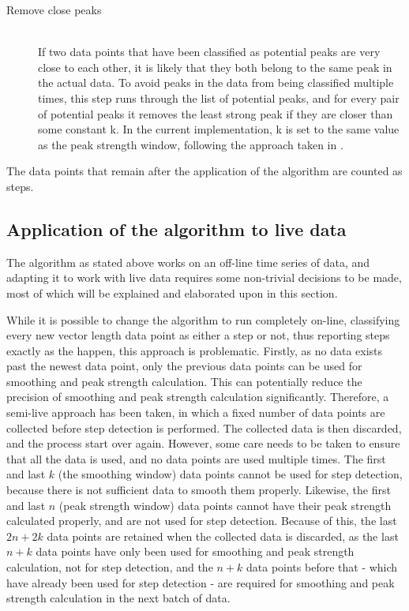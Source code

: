 \begin{description}
\item[Remove close peaks] \hfill \\
If two data points that have been classified as potential peaks are very close to each other, it is likely that they both belong to the same peak in the actual data. To avoid peaks in the data from being classified multiple times, this step runs through the list of potential peaks, and for every pair of potential peaks it removes the least strong peak if they are closer than some constant k. In the current implementation, k is set to the same value as the peak strength window, following the approach taken in \cite{SimplePeakDetect}.

\end{description}

The data points that remain after the application of the algorithm are counted as steps.

\subsection{Application of the algorithm to live data}
The algorithm as stated above works on an off-line time series of data, and adapting it to work with live data requires some non-trivial decisions to be made, most of which will be explained and elaborated upon in this section. 

While it is possible to change the algorithm to run completely on-line, classifying every new vector length data point as either a step or not, thus reporting steps exactly as the happen, this approach is problematic. Firstly, as no data exists past the newest data point, only the previous data points can be used for smoothing and peak strength calculation. This can potentially reduce the precision of smoothing and peak strength calculation significantly. Therefore, a semi-live approach has been taken, in which a fixed number of data points are collected before step detection is performed. The collected data is then discarded, and the process start over again. However, some care needs to be taken to ensure that all the data is used, and no data points are used multiple times. The first and last $k$ (the smoothing window) data points cannot be used for step detection, because there is not sufficient data to smooth them properly. Likewise, the first and last $n$ (peak strength window) data points cannot have their peak strength calculated properly, and are not used for step detection. Because of this, the last $2n + 2k$ data points are retained when the collected data is discarded, as the last $n+k$ data points have only been used for smoothing and peak strength calculation, not for step detection, and the $n+k$ data points before that - which have already been used for step detection - are required for smoothing and peak strength calculation in the next batch of data.


